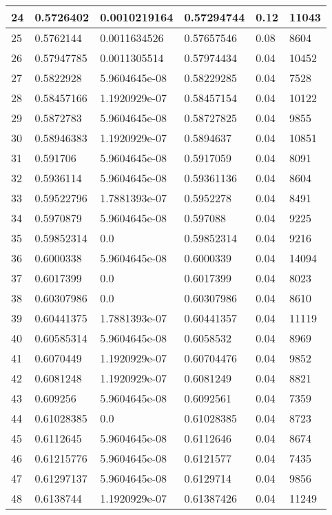 \begin{longtable}{|l|l|l|l|l|l|}
24 & 0.5726402 & 0.0010219164 & 0.57294744 & 0.12 & 11043 \\ \hline 
25 & 0.5762144 & 0.0011634526 & 0.57657546 & 0.08 & 8604 \\ \hline 
26 & 0.57947785 & 0.0011305514 & 0.57974434 & 0.04 & 10452 \\ \hline 
27 & 0.5822928 & 5.9604645e-08 & 0.58229285 & 0.04 & 7528 \\ \hline 
28 & 0.58457166 & 1.1920929e-07 & 0.58457154 & 0.04 & 10122 \\ \hline 
29 & 0.5872783 & 5.9604645e-08 & 0.58727825 & 0.04 & 9855 \\ \hline 
30 & 0.58946383 & 1.1920929e-07 & 0.5894637 & 0.04 & 10851 \\ \hline 
31 & 0.591706 & 5.9604645e-08 & 0.5917059 & 0.04 & 8091 \\ \hline 
32 & 0.5936114 & 5.9604645e-08 & 0.59361136 & 0.04 & 8604 \\ \hline 
33 & 0.59522796 & 1.7881393e-07 & 0.5952278 & 0.04 & 8491 \\ \hline 
34 & 0.5970879 & 5.9604645e-08 & 0.597088 & 0.04 & 9225 \\ \hline 
35 & 0.59852314 & 0.0 & 0.59852314 & 0.04 & 9216 \\ \hline 
36 & 0.6000338 & 5.9604645e-08 & 0.6000339 & 0.04 & 14094 \\ \hline 
37 & 0.6017399 & 0.0 & 0.6017399 & 0.04 & 8023 \\ \hline 
38 & 0.60307986 & 0.0 & 0.60307986 & 0.04 & 8610 \\ \hline 
39 & 0.60441375 & 1.7881393e-07 & 0.60441357 & 0.04 & 11119 \\ \hline 
40 & 0.60585314 & 5.9604645e-08 & 0.6058532 & 0.04 & 8969 \\ \hline 
41 & 0.6070449 & 1.1920929e-07 & 0.60704476 & 0.04 & 9852 \\ \hline 
42 & 0.6081248 & 1.1920929e-07 & 0.6081249 & 0.04 & 8821 \\ \hline 
43 & 0.609256 & 5.9604645e-08 & 0.6092561 & 0.04 & 7359 \\ \hline 
44 & 0.61028385 & 0.0 & 0.61028385 & 0.04 & 8723 \\ \hline 
45 & 0.6112645 & 5.9604645e-08 & 0.6112646 & 0.04 & 8674 \\ \hline 
46 & 0.61215776 & 5.9604645e-08 & 0.6121577 & 0.04 & 7435 \\ \hline 
47 & 0.61297137 & 5.9604645e-08 & 0.6129714 & 0.04 & 9856 \\ \hline 
48 & 0.6138744 & 1.1920929e-07 & 0.61387426 & 0.04 & 11249 \\ \hline 

\end{longtable}
